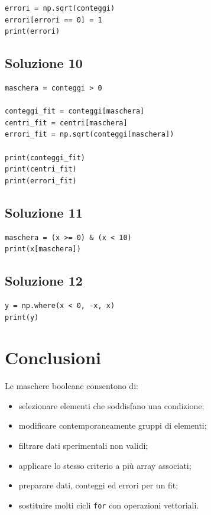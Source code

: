 \documentclass[11pt,a4paper]{book}
\begin{document}
\begin{lstlisting}
errori = np.sqrt(conteggi)
errori[errori == 0] = 1
print(errori)
\end{lstlisting}

\subsection*{Soluzione 10}

\begin{lstlisting}
maschera = conteggi > 0

conteggi_fit = conteggi[maschera]
centri_fit = centri[maschera]
errori_fit = np.sqrt(conteggi[maschera])

print(conteggi_fit)
print(centri_fit)
print(errori_fit)
\end{lstlisting}

\subsection*{Soluzione 11}

\begin{lstlisting}
maschera = (x >= 0) & (x < 10)
print(x[maschera])
\end{lstlisting}

\subsection*{Soluzione 12}

\begin{lstlisting}
y = np.where(x < 0, -x, x)
print(y)
\end{lstlisting}

\section{Conclusioni}

Le maschere booleane consentono di:

\begin{itemize}
    \item selezionare elementi che soddisfano una condizione;
    \item modificare contemporaneamente gruppi di elementi;
    \item filtrare dati sperimentali non validi;
    \item applicare lo stesso criterio a più array associati;
    \item preparare dati, conteggi ed errori per un fit;
    \item sostituire molti cicli \texttt{for} con operazioni vettoriali.
\end{itemize}
\end{document}
